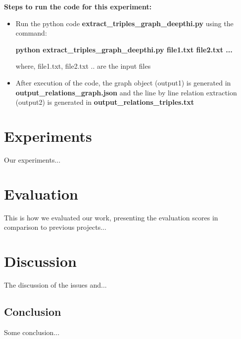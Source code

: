 \documentclass[11pt,letterpaper]{article}
\begin{document}
\noindent \newline
\textbf{Steps to run the code for this experiment:}
\begin{itemize}
    \item Run the python code \textbf{extract\_triples\_graph\_deepthi.py} using the command:
    
    \textbf{python extract\_triples\_graph\_deepthi.py file1.txt file2.txt ...}
    
    where, file1.txt, file2.txt .. are the input files
    
    \item After execution of the code, the graph object (output1) is generated in \textbf{output\_relations\_graph.json} and the line by line relation extraction (output2) is generated in \textbf{output\_relations\_triples.txt}
\end{itemize}
\section{Experiments}

Our experiments...



\section{Evaluation}

This is how we evaluated our work, presenting the evaluation scores in comparison to previous projects...



\section{Discussion}

The discussion of the issues and...


\subsection{Conclusion}

Some conclusion...



\end{document}
